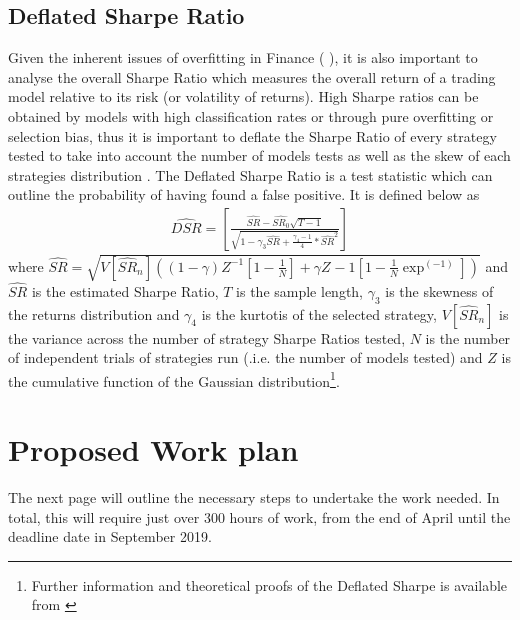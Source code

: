 \documentclass[12pt, a4paper]{article}
\begin{document}
\subsection{Deflated Sharpe Ratio}
Given the inherent issues of overfitting in Finance (\cite{Arnott2018} \cite{LopezdePrado2018}), it is also important to analyse the overall Sharpe Ratio \cite{Sharpe2009} which measures the overall return of a trading model relative to its risk (or volatility of returns). High Sharpe ratios can be obtained by models with high classification rates or through pure overfitting or selection bias, thus it is important to deflate the Sharpe Ratio of every strategy tested to take into account the number of models tests as well as the skew of each strategies distribution \cite{Bailey2014}. 
The Deflated Sharpe Ratio is a test statistic which can outline the probability of having found a false positive. It is defined below as
\begin{align}
\widehat{DSR} = \left[
		 				\frac{\widehat{SR}-\widehat{SR_{0}}\sqrt{T-1}}
						{\sqrt{1-\gamma_{3}\widehat{SR} + \frac{\gamma_{4} - 1}{4}*\widehat{SR}^{2}}} 
				 \right]
\end{align}
where $\widehat{SR} = \sqrt{V\left[\widehat{SR}_{n}\right] 
						\left(      	
							\left(1- \gamma\right) Z^{-1} \left[ 1- \frac{1}{N}\right] + \gamma Z^{}-1 \left[ 1-\frac{1}{N}\exp^(-1) \right] 
						 \right)}$
and $\widehat{SR}$ is the estimated Sharpe Ratio, $T$ is the sample length, $\gamma_{3}$ is the skewness of the returns distribution and $\gamma_{4}$ is the kurtotis of the selected strategy,  $V\left[\widehat{SR}_{n}\right]$ is the variance across the number of strategy Sharpe Ratios tested, $N$ is the number of independent trials of strategies run (.i.e. the number of models tested) and $Z$ is the cumulative function of the Gaussian distribution\footnote{Further information and theoretical proofs of the Deflated Sharpe is available from \cite{Bailey2014}}.  

\section{Proposed Work plan}
The next page will outline the necessary steps to undertake the work needed. In total, this will require just over 300 hours of work, from the end of April until the deadline date in September 2019.
\end{document}

